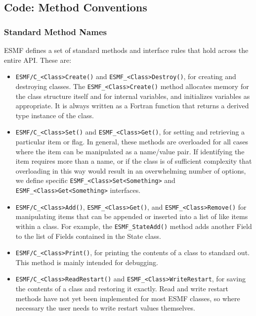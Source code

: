 \subsection{Code: Method Conventions}

\subsubsection{Standard Method Names}

ESMF defines a set of standard methods and interface rules that
hold across the entire API.  These are: 

\begin{itemize}

\item {\tt ESMF/C\_<Class>Create()} and {\tt ESMF\_<Class>Destroy()}, for creating and 
destroying classes.  The {\tt ESMF\_<Class>Create()} method allocates 
memory for the class structure itself and for internal variables, and
initializes variables as appropriate.  It is always written as a 
Fortran function that returns a derived type instance of the class.

\item {\tt ESMF/C\_<Class>Set()} and {\tt ESMF\_<Class>Get()}, for setting 
and retrieving a particular item or flag.  In general, these methods are
overloaded for all cases where the item can be manipulated as a
name/value pair.  If identifying the item requires more than a 
name, or if the class is of sufficient complexity that overloading
in this way would result in an overwhelming number of options, we 
define specific {\tt ESMF\_<Class>Set<Something>} and 
{\tt ESMF\_<Class>Get<Something>} interfaces.

\item {\tt ESMF/C\_<Class>Add()}, {\tt ESMF\_<Class>Get()}, and 
{\tt ESMF\_<Class>Remove()} for manipulating 
items that can be appended or inserted into a list of like
items within a class.  For example, the {\tt ESMF\_StateAdd()}
method adds another Field to the list of Fields contained
in the State class.

\item {\tt ESMF/C\_<Class>Print()}, for printing the contents of a class to 
standard out.  This method is mainly intended for debugging.

\item {\tt ESMF/C\_<Class>ReadRestart()} and {\tt ESMF\_<Class>WriteRestart}, 
for saving the contents of a class and restoring it exactly.  Read
and write restart methods have not yet been implemented for most
ESMF classes, so where necessary the user needs to write restart 
values themselves.


\end{itemize}
